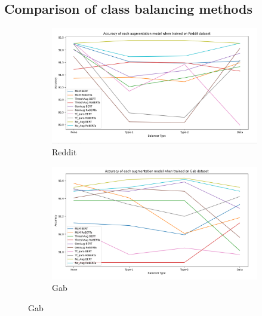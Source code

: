 \documentclass[11pt,a4paper]{article}
\begin{document}
\subsection{Comparison of class balancing methods}

\begin{figure}
    \centering
    \begin{subfigure}{1.5\columnwidth}
        \includegraphics[width=\columnwidth]{figs/reddit.png}
        \caption{Reddit}
        \label{fig:redditbal}
    \end{subfigure}
    
    \begin{subfigure}{1.5\columnwidth}
        \includegraphics[width=\columnwidth]{figs/gab.png}
        \caption{Gab}
        \label{fig:gabbal}
    \end{subfigure}
    

\end{figure}
\end{document}
